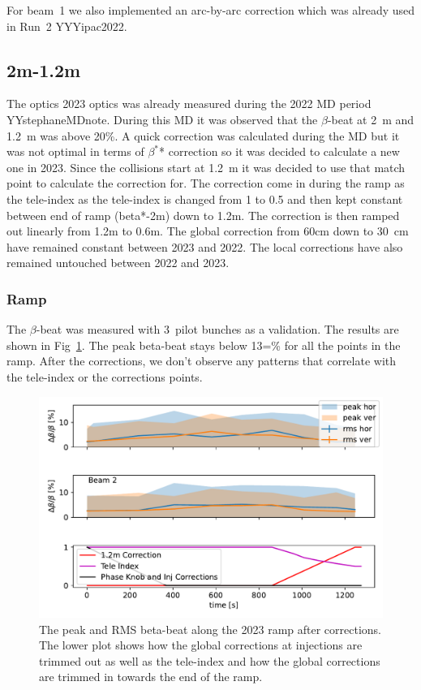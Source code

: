 \documentclass{cernatsnote}
\begin{document}
For beam~1 we also implemented an arc-by-arc correction which was already used in Run~2 YYYipac2022.

\subsection{2m-1.2m}
The optics 2023 optics was already measured during the 2022 MD period YYstephaneMDnote. During this MD it was observed that the $\beta$-beat at 2~m and 1.2~m was above 20\%. A quick correction was calculated during the MD but it was not optimal in terms of $\beta^*$* correction so it was decided to calculate a new one in 2023. Since the collisions start at 1.2~m it was decided to use that match point to calculate the correction for. The correction come in during the ramp as the tele-index as the tele-index is changed from 1 to 0.5 and then kept constant between end of ramp (beta*-2m) down to 1.2m. The correction is then ramped out linearly from 1.2m to 0.6m. The global correction from 60cm down to 30~cm have remained constant between 2023 and 2022. The local corrections have also remained untouched between 2022 and 2023. 
\subsubsection{Ramp}
The $\beta$-beat was measured with 3~pilot bunches as a validation. The results are shown in Fig~\ref{fig:ramp2023_with_all_info}. The peak beta-beat stays below 13=\% for all the points in the ramp. After the corrections, we don't observe any patterns that correlate with the tele-index or the corrections points. 
\begin{figure}
    \centering
    \includegraphics{2023/ramp/rms_in_ramp_with_ats_factor.pdf}
    \caption{The peak and RMS beta-beat along the 2023 ramp after corrections. The lower plot shows how the global corrections at injections are trimmed out as well as the tele-index and how the global corrections are trimmed in towards the end of the ramp. }
    \label{fig:ramp2023_with_all_info}
\end{figure}
\end{document}
